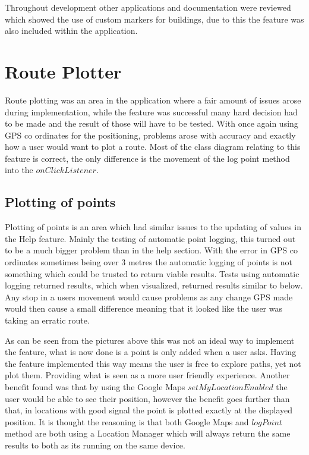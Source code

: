 Throughout development other applications and documentation were reviewed which showed the use of custom markers for buildings, due to this the feature was also included within the application.

\section{Route Plotter}
Route plotting was an area in the application where a fair amount of issues arose during implementation, while the feature was successful many hard decision had to be made and the result of those will have to be tested. With once again using GPS co ordinates for the positioning, problems arose with accuracy and exactly how a user would want to plot a route. Most of the class diagram relating to this feature is correct, the only difference is the movement of the log point method into the $onClickListener$.
\subsection{Plotting of points}
Plotting of points is an area which had similar issues to the updating of values in the Help feature. Mainly the testing of automatic point logging, this turned out to be a much bigger problem than in the help section. With the error in GPS co ordinates sometimes being over 3 metres\cite{gps} the automatic logging of points is not something which could be trusted to return viable results. Tests using automatic logging returned results, which when visualized, returned results similar to below. Any stop in a users movement would cause problems as any change GPS made would then cause a small difference meaning that it looked like the user was taking an erratic route.

As can be seen from the pictures above this was not an ideal way to implement the feature, what is now done is a point is only added when a user asks. Having the feature implemented this way means the user is free to explore paths, yet not plot them. Providing what is seen as a more user friendly experience. Another benefit found was that by using the Google Maps $setMyLocationEnabled$\cite{setlocation} the user would be able to see their position, however the benefit goes further than that, in locations with good signal the point is plotted exactly at the displayed position. It is thought the reasoning is that both Google Maps and $logPoint$ method are both using a Location Manager which will always return the same results to both as its running on the same device.
